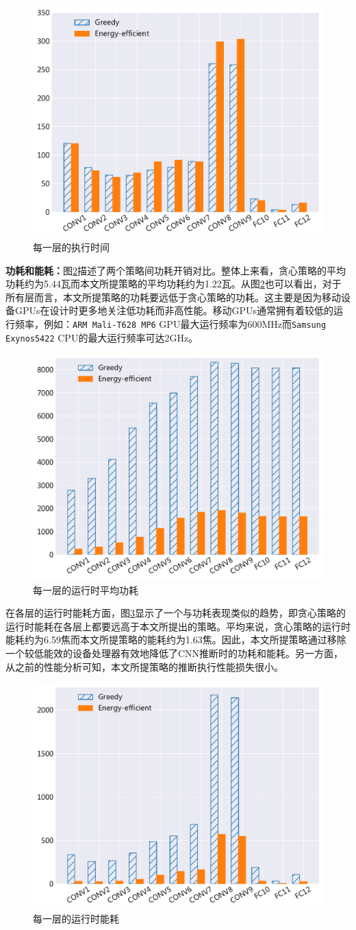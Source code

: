 \begin{figure}[htbp]
    \centering
    \includegraphics[height=0.4\textwidth]{figures/hc_time.pdf}
    \caption{每一层的执行时间}\label{figure:figure32}
\end{figure}

\textbf{功耗和能耗：}图\ref{figure:figure33}描述了两个策略间功耗开销对比。整体上来看，贪心策略的平均功耗约为5.44瓦而本文所提策略的平均功耗约为1.22瓦。从图\ref{figure:figure33}也可以看出，对于所有层而言，本文所提策略的功耗要远低于贪心策略的功耗。这主要是因为移动设备GPUs在设计时更多地关注低功耗而非高性能。移动GPUs通常拥有着较低的运行频率，例如：\texttt{ARM Mali-T628 MP6} GPU最大运行频率为600MHz而\texttt{Samsung Exynos5422} CPU的最大运行频率可达2GHz\cite{hardkernel.com}。

\begin{figure}[htbp]
    \centering
    \includegraphics[height=0.4\textwidth]{figures/hc_power.pdf}
    \caption{每一层的运行时平均功耗}\label{figure:figure33}
\end{figure}

在各层的运行时能耗方面，图\ref{figure:figure34}显示了一个与功耗表现类似的趋势，即贪心策略的运行时能耗在各层上都要远高于本文所提出的策略。平均来说，贪心策略的运行时能耗约为6.59焦而本文所提策略的能耗约为1.63焦。因此，本文所提策略通过移除一个较低能效的设备处理器有效地降低了CNN推断时的功耗和能耗。另一方面，从之前的性能分析可知，本文所提策略的推断执行性能损失很小。

\begin{figure}[htbp]
    \centering
    \includegraphics[height=0.4\textwidth]{figures/hc_energy.pdf}
    \caption{每一层的运行时能耗}\label{figure:figure34}
\end{figure}

